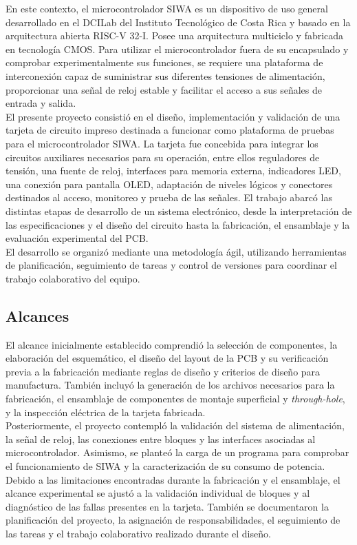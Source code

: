 \documentclass[journal,trans]{IEEEtran}
\begin{document}
En este contexto, el microcontrolador SIWA es un dispositivo de uso general desarrollado en el DCILab del Instituto Tecnológico de Costa Rica y basado en la arquitectura abierta RISC-V 32-I. Posee una arquitectura multiciclo y fabricada en tecnología CMOS. Para utilizar el microcontrolador fuera de su encapsulado y comprobar experimentalmente sus funciones, se requiere una plataforma de interconexión capaz de suministrar sus diferentes tensiones de alimentación, proporcionar una señal de reloj estable y facilitar el acceso a sus señales de entrada y salida.\\

El presente proyecto consistió en el diseño, implementación y validación de una tarjeta de circuito impreso destinada a funcionar como plataforma de pruebas para el microcontrolador SIWA. La tarjeta fue concebida para integrar los circuitos auxiliares necesarios para su operación, entre ellos reguladores de tensión, una fuente de reloj, interfaces para memoria externa, indicadores LED, una conexión para pantalla OLED, adaptación de niveles lógicos y conectores destinados al acceso, monitoreo y prueba de las señales. El trabajo abarcó las distintas etapas de desarrollo de un sistema electrónico, desde la interpretación de las especificaciones y el diseño del circuito hasta la fabricación, el ensamblaje y la evaluación experimental del PCB.\\

El desarrollo se organizó mediante una metodología ágil, utilizando herramientas de planificación, seguimiento de tareas y control de versiones para coordinar el trabajo colaborativo del equipo.

\subsection{Alcances}
El alcance inicialmente establecido comprendió la selección de componentes, la elaboración del esquemático, el diseño del layout de la PCB y su verificación previa a la fabricación mediante reglas de diseño y criterios de diseño para manufactura. También incluyó la generación de los archivos necesarios para la fabricación, el ensamblaje de componentes de montaje superficial y \textit{through-hole}, y la inspección eléctrica de la tarjeta fabricada.\\

Posteriormente, el proyecto contempló la validación del sistema de alimentación, la señal de reloj, las conexiones entre bloques y las interfaces asociadas al microcontrolador. Asimismo, se planteó la carga de un programa para comprobar el funcionamiento de SIWA y la caracterización de su consumo de potencia. Debido a las limitaciones encontradas durante la fabricación y el ensamblaje, el alcance experimental se ajustó a la validación individual de bloques y al diagnóstico de las fallas presentes en la tarjeta. También se documentaron la planificación del proyecto, la asignación de responsabilidades, el seguimiento de las tareas y el trabajo colaborativo realizado durante el diseño.
\end{document}
